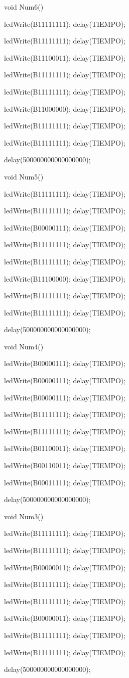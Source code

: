 \documentclass{article}
\begin{document}
void Num6(){
   
   ledWrite(B11111111); delay(TIEMPO);
   
   ledWrite(B11111111); delay(TIEMPO);
   
   ledWrite(B11100011); delay(TIEMPO);
   
   ledWrite(B11111111); delay(TIEMPO);
   
   ledWrite(B11111111); delay(TIEMPO);
   
   ledWrite(B11000000); delay(TIEMPO);
   
   ledWrite(B11111111); delay(TIEMPO);
   
   ledWrite(B11111111); delay(TIEMPO);
  
  delay(500000000000000000);}
  
void Num5(){
     
     ledWrite(B11111111); delay(TIEMPO);
   
   ledWrite(B11111111); delay(TIEMPO);
   
   ledWrite(B00000111); delay(TIEMPO);
   
   ledWrite(B11111111); delay(TIEMPO);
   
   ledWrite(B11111111); delay(TIEMPO);
   
   ledWrite(B11100000); delay(TIEMPO);
   
   ledWrite(B11111111); delay(TIEMPO);
   
   ledWrite(B11111111); delay(TIEMPO);
  
  delay(500000000000000000);}

void Num4(){
     
   ledWrite(B00000111); delay(TIEMPO);
   
   ledWrite(B00000111); delay(TIEMPO);
   
   ledWrite(B00000111); delay(TIEMPO);
   
   ledWrite(B11111111); delay(TIEMPO);
   
   ledWrite(B11111111); delay(TIEMPO);
   
   ledWrite(B01100011); delay(TIEMPO);
   
   ledWrite(B00110011); delay(TIEMPO);
   
   ledWrite(B00011111); delay(TIEMPO);
  
  delay(500000000000000000);}

void Num3(){
      
   ledWrite(B11111111); delay(TIEMPO);
   
   ledWrite(B11111111); delay(TIEMPO);
   
   ledWrite(B00000011); delay(TIEMPO);
   
   ledWrite(B11111111); delay(TIEMPO);
   
   ledWrite(B11111111); delay(TIEMPO);
   
   ledWrite(B00000011); delay(TIEMPO);
   
   ledWrite(B11111111); delay(TIEMPO);
   
   ledWrite(B11111111); delay(TIEMPO);
  
  delay(500000000000000000);}
\end{document}
